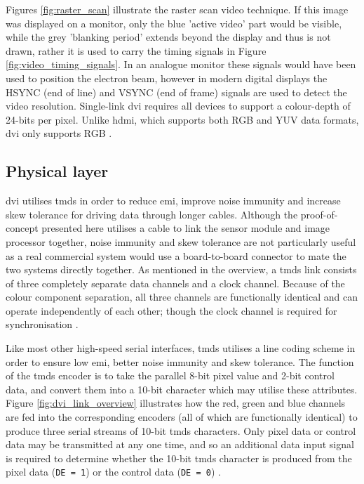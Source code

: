 Figures \ref{fig:raster_scan} illustrate the raster scan video technique. If this image was displayed on a monitor, only the blue 'active video' part would be visible, while the grey 'blanking period' extends beyond the display and thus is not drawn, rather it is used to carry the timing signals in Figure \ref{fig:video_timing_signals}. In an analogue monitor these signals would have been used to position the electron beam, however in modern digital displays the HSYNC (end of line) and VSYNC (end of frame) signals are used to detect the video resolution. Single-link \gls{dvi} requires all devices to support a colour-depth of 24-bits per pixel. Unlike \gls{hdmi}, which supports both RGB and YUV data formats, \gls{dvi} only supports RGB \cite{dvi_spec}.

\subsection{Physical layer}

\gls{dvi} utilises \gls{tmds} in order to reduce \gls{emi}, improve noise immunity and increase skew tolerance for driving data through longer cables. Although the proof-of-concept presented here utilises a cable to link the sensor module and image processor together, noise immunity and skew tolerance are not particularly useful as a real commercial system would use a board-to-board connector to mate the two systems directly together. As mentioned in the overview, a \gls{tmds} link consists of three completely separate data channels and a clock channel. Because of the colour component separation, all three channels are functionally identical and can operate independently of each other; though the clock channel is required for synchronisation \cite{dvi_spec}.

Like most other high-speed serial interfaces, \gls{tmds} utilises a line coding scheme in order to ensure low \gls{emi}, better noise immunity and skew tolerance. The function of the \gls{tmds} encoder is to take the parallel 8-bit pixel value and 2-bit control data, and convert them into a 10-bit character which may utilise these attributes. Figure \ref{fig:dvi_link_overview} illustrates how the red, green and blue channels are fed into the corresponding encoders (all of which are functionally identical) to produce three serial streams of 10-bit \gls{tmds} characters. Only pixel data or control data may be transmitted at any one time, and so an additional data input signal is required to determine whether the 10-bit \gls{tmds} character is produced from the pixel data (\texttt{DE = 1}) or the control data (\texttt{DE = 0}) \cite{dvi_spec}. 

